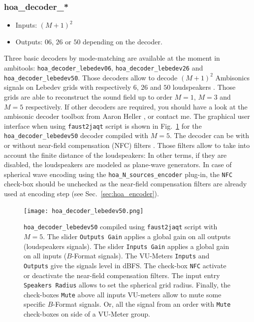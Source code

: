 \documentclass[10pt,a4paper]{article}
\begin{document}
\subsubsection{hoa\_decoder\_*}
\label{sec:hoa_decoder}
\begin{itemize}
\item Inputs: $(M+1)^2$
\item Outputs: $06$, $26$ or $50$ depending on the decoder.
\end{itemize}

Three basic decoders by mode-matching \cite{daniel2000representation,poletti2005three} are available at the moment in ambitools: \lstinline'hoa_decoder_lebedev06', \lstinline'hoa_decoder_lebedev26' and
\lstinline'hoa_decoder_lebedev50'. Those decoders allow to decode $(M+1)^2$ Ambisonics signals on Lebedev grids with respectively $6$, $26$ and $50$ loudspeakers \cite{lebedev1975values,lecomte2015on}. Those grids are able to reconstruct the sound field up to order $M=1$, $M=3$ and $M=5$ respectively.
If other decoders are required, you should have a look at the ambisonic decoder toolbox from Aaron Heller \cite{heller2012toolkit}, or contact me. The graphical user interface when using \lstinline'faust2jaqt' script is shown in Fig.~\ref{fig:hoa_decoder_lebedev50} for the \lstinline'hoa_decoder_lebedev50' decoder compiled with $M=5$. The decoder can be with or without near-field compensation (NFC) filters \cite{daniel2003further,lecomte2015real}. Those filters allow to take into account the finite distance of the loudspeakers: In other terms, if they are disabled, the loudspeakers are modeled as plane-wave generators. In case of spherical wave encoding using the \lstinline'hoa_N_sources_encoder' plug-in, the \lstinline'NFC' check-box should be unchecked as the near-field compensation filters are already used at encoding step (see Sec.~\ref{sec:hoa_encoder}).
\begin{figure}[!ht]
\texttt{[image: hoa\_decoder\_lebedev50.png]}
\caption{\lstinline'hoa_decoder_lebedev50' compiled using \lstinline'faust2jaqt' script with $M=5$. The slider \lstinline'Outputs Gain' applies a global gain on all outputs (loudspeakers signals). The slider \lstinline'Inputs Gain' applies a global gain on all inputs ($B$-Format signals). The VU-Meters \lstinline'Inputs' and \lstinline'Outputs' give the signals level in dBFS. The check-box \lstinline'NFC' activate or deactivate the near-field compensation filters. The input entry \lstinline'Speakers Radius' allows to set the spherical grid radius. Finally, the check-boxes \lstinline'Mute' above all inputs VU-meters allow to mute some specific $B$-Format signals. Or, all the signal from an order with \lstinline'Mute' check-boxes on side of a VU-Meter group.}
\label{fig:hoa_decoder_lebedev50}
\end{figure}
\end{document}
